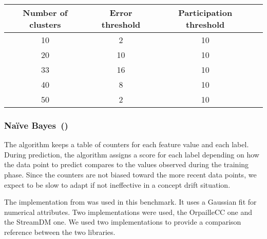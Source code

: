 \begin{table}
		\begin{center}
		\begin{tabular}{|c|c|c|c|}
		\hline
		Number of clusters & Error threshold & Participation threshold \\
		\hline
		10                 & 2               & 10                      \\
		20                 & 10              & 10                      \\
		33                 & 16              & 10                      \\
		40                 & 8               & 10                      \\
		50                 & 2               & 10                      \\
		\hline
		\end{tabular}
		\end{center}
		\caption{}
		\label{tab:mcnn-parameters}
\end{table}
\subsubsection{Naïve Bayes~(\naivebayes)~\cite{naive_bayes}}
The \naivebayes algorithm keeps a table of counters for each feature value and
each label. During prediction, the algorithm assigns a score for each label
depending on how the data point to predict compares to the values observed
during the training phase. Since the counters are not biased toward the more
recent data points, we expect \naivebayes to be slow to adapt if not ineffective
in a concept drift situation.

The implementation from \streamdmcpp was used in this benchmark. It uses a
Gaussian fit for numerical attributes. Two implementations were used, the
OrpailleCC one and the StreamDM one. We used two implementations to provide a
comparison reference between the two libraries.


